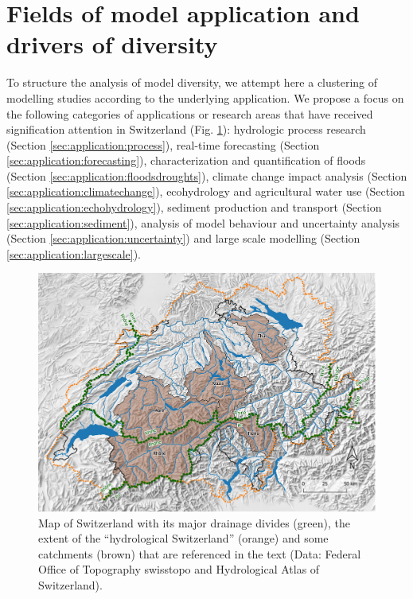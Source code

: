 \documentclass[10pt,a4paper]{article}
\begin{document}
\section{Fields of model application and drivers of diversity}
\label{sec:application}

To structure the analysis of model diversity, we attempt here a
clustering of modelling studies according to the underlying application.
We propose a focus on the following categories of applications or
research areas that have received signification attention in Switzerland
(Fig. \ref{fig:map}): hydrologic process research
(Section \ref{sec:application:process}), real-time forecasting 
(Section \ref{sec:application:forecasting}), characterization and 
quantification of floods (Section \ref{sec:application:floodsdroughts}), 
climate change impact analysis (Section \ref{sec:application:climatechange}), 
ecohydrology and agricultural water use (Section \ref{sec:application:echohydrology}),
sediment production and transport (Section \ref{sec:application:sediment}), analysis of model
behaviour and uncertainty analysis (Section \ref{sec:application:uncertainty}) and large scale
modelling (Section \ref{sec:application:largescale}).

\begin{figure}[htb]
	\begin{center}
		\includegraphics[width=0.95\columnwidth]{figures/map}
		\caption{{Map of Switzerland with its major drainage divides (green), the extent
				of the ``hydrological Switzerland'' (orange) and some catchments (brown)
				that are referenced in the text (Data: Federal Office of Topography
				swisstopo and Hydrological Atlas of Switzerland). 
				\label{fig:map}
		}}
	\end{center}
\end{figure}
\end{document}
